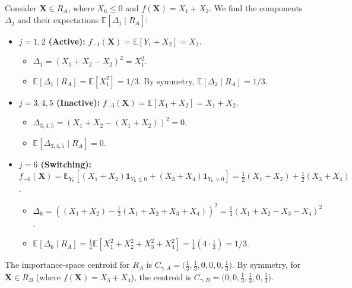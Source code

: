 \documentclass{article}
\theoremstyle{plain}
\theoremstyle{definition}
\theoremstyle{remark}
\begin{document}
Consider $\mathbf{X} \in R_A$, where $X_6 \le 0$ and $f(\mathbf{X}) = X_1 + X_2$. We find the components $\Delta_j$ and their expectations $\mathbb{E}[\Delta_j \mid R_A]$:
\begin{itemize}
    \item \textbf{$j=1, 2$ (Active):} $f_{-1}(\mathbf{X}) = \mathbb{E}[Y_1+X_2] = X_2$.
    \begin{itemize}
        \item $\Delta_1 = (X_1+X_2 - X_2)^2 = X_1^2$.
        \item $\mathbb{E}[\Delta_1 \mid R_A] = \mathbb{E}[X_1^2] = 1/3$. By symmetry, $\mathbb{E}[\Delta_2 \mid R_A] = 1/3$.
    \end{itemize}
    \item \textbf{$j=3, 4, 5$ (Inactive):} $f_{-3}(\mathbf{X}) = \mathbb{E}[X_1+X_2] = X_1+X_2$.
    \begin{itemize}
        \item $\Delta_{3,4,5} = (X_1+X_2 - (X_1+X_2))^2 = 0$.
        \item $\mathbb{E}[\Delta_{3,4,5} \mid R_A] = 0$.
    \end{itemize}
    \item \textbf{$j=6$ (Switching):} $f_{-6}(\mathbf{X}) = \mathbb{E}_{Y_6}[(X_1+X_2)\mathbf{1}_{Y_6 \le 0} + (X_3+X_4)\mathbf{1}_{Y_6 > 0}] = \frac{1}{2}(X_1+X_2) + \frac{1}{2}(X_3+X_4)$.
    \begin{itemize}
        \item $\Delta_6 = \left( (X_1+X_2) - \frac{1}{2}(X_1+X_2+X_3+X_4) \right)^2 = \frac{1}{4}(X_1+X_2 - X_3-X_4)^2$.
        \item $\mathbb{E}[\Delta_6 \mid R_A] = \frac{1}{4}\mathbb{E}[X_1^2 + X_2^2 + X_3^2 + X_4^2] = \frac{1}{4}(4 \cdot \frac{1}{3}) = 1/3$.
    \end{itemize}
\end{itemize}
The importance-space centroid for $R_A$ is $C_{\gamma, A} = \bigl(\frac{1}{3}, \frac{1}{3}, 0, 0, 0, \frac{1}{3}\bigr)$.
By symmetry, for $\mathbf{X} \in R_B$ (where $f(\mathbf{X}) = X_3+X_4$), the centroid is $C_{\gamma, B} = \bigl(0, 0, \frac{1}{3}, \frac{1}{3}, 0, \frac{1}{3}\bigr)$.
\end{document}
